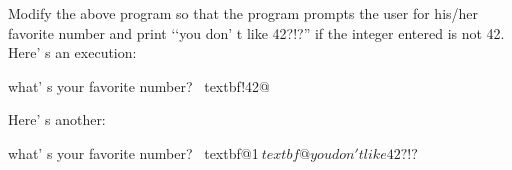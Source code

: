 Modify the above program so that the program prompts the user for his/her favorite number and print \lq\lq you don' t like 42?!?'' if the integer entered is not 42. Here' s an execution:

\begin{console}[commandchars=\~\!\@]

what' s your favorite number? ~textbf!42@ 

\end{console}

Here' s another:

\begin{console}[commandchars=\~\@\$]

what' s your favorite number? ~textbf@1$

~textbf@you don't like 42?!?$  

\end{console}

